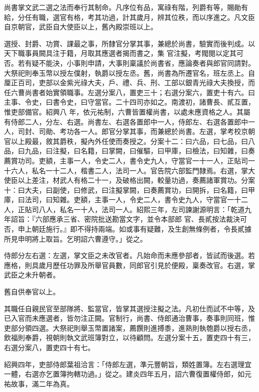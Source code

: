 \begin{pinyinscope}
 尚書掌文武二選之法而奉行其制命。凡序位有品，寓祿有階，列爵有等，賜勛有給，分任有職，選官有格，考其功過，計其歲月，辨其位秩，而以序進之。凡文臣自京朝官，武臣自大使臣以上，舊內殿崇班以上。



 選授、封爵、功賞、課最之事，所隸官分掌其事，兼總於尚書，驗實而後判成。以天下職事員闕具注于籍，月取其應選者揭而書之，集
 官注擬，考閥閱以定其可否。若有疑不能決，小事則申請，大事則稟議於尚書省，應論奏者與郎官同請對。大祭祀則奉玉幣以授左僕射，執爵以授左丞。舊，尚書為所遷官名，班左丞上。自厘正百司，吏部以金紫光祿大夫，戶、禮、兵、刑、工部以銀青光祿大夫換授，而任六曹尚書者始實領職事。左選分案八，置吏三十；右選分案六，置吏十有六。曰主事、令史，曰書令史，曰守當官。二十四司亦如之。南渡初，諸曹長、貳互置，惟吏部備官。紹興八
 年，依元祐制，六曹皆置權尚書，以處未應資格之人。其屬有侍郎二人，分左、右選。尚書左、右選各置郎中一人，侍郎左、右選各置郎中一人，司封、司勛、考功各一人。郎官分掌其事，而兼總於尚書。左選，掌考校京朝官以上殿最，敘其爵秩，擬內外任使而奏授之。分案十二：曰六品，曰七品，曰八品，曰九品，曰注擬，曰名籍，曰掌闕，曰催驅，曰甲庫，曰檢法，曰知雜，曰奏薦賞功司。吏額，主事一人，令史二人，書令史九人，守當官一十一人，正貼司一
 十六人，私名一十二人，楷書二人，法司一人。官告院六部監門隸焉。右選，掌大使臣以上差注，材武人有格二十一，及破格出闕，較量功過，奏薦諸軍賞功。分案十：曰大夫，曰副使，曰修武，曰注擬掌闕，曰奏薦賞功，曰開拆，曰名籍，曰甲庫，曰法司，曰知雜。吏額，主事一人，令史二人，書令史九人，守當官一十二人，正貼司八人，私名一十人，法司一人。紹熙三年，左司諫謝源明言：「乾道九年詔旨：『六部應承三省、密院批送勘當文字，並令本部郎
 官、長貳按法裁決可否，申上朝廷施行。』即不得持兩端。如或事有疑難，及生創無條例者，令長貳據所見申明將上取旨。乞明詔六曹遵守。」從之。



 侍郎分左右選：左選，掌文臣之未改官者。凡始命而未應參部者，皆試而後選。若應格，則具歲月歷任功罪及所舉官員數，同郎官引見於便殿，稟奏改官。右選，掌武臣之未升朝者。



 舊自供奉官以上。



 其職任自親民官至部隊將、監當官，皆掌其選授注擬之法。凡初仕而試不中等，及
 已入官而未應選者，皆勿注正闕。官制行，尚書、侍郎通治曹事，奏事則同班，惟吏部分領四選。大祭祀則舉玉幣置諸案，薦饌則進搏黍，進熟則執匏爵以授右丞，飲福則奉爵，視朝則執文武班簿對立，以待顧問。左選分案十五，置吏四十有三，右選分案八，置吏四十有七。



 紹興四年，吏部侍郎葉祖洽言：「侍郎左選，準元豐朝旨，類姓置簿。左右選理宜一體，右選亦乞置簿拘轄功過。」從之。建炎四年五月，詔六曹復置權侍郎，如元祐故事，滿二年為真。




\end{pinyinscope}
